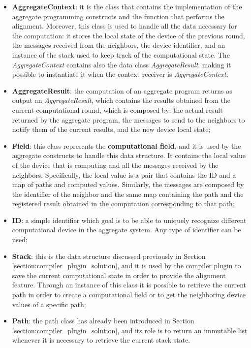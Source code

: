 \begin{itemize}
    \item \textbf{AggregateContext}: it is the class that contains the implementation of the aggregate programming constructs and the function that performs the alignment. Moreover, this class is used to handle all the data necessary for the computation: it stores the local state of the device of the previous round, the messages received from the neighbors, the device identifier, and an instance of the stack used to keep track of the computational state. The \textit{AggregateContext} contains also the data class \textit{AggregateResult}, making it possible to instantiate it when the context receiver is \textit{AggregateContext};
    \item \textbf{AggregateResult}: the computation of an aggregate program returns as output an \textit{AggregateResult}, which contains the results obtained from the current computational round, which is composed by: the actual result returned by the aggregate program, the messages to send to the neighbors to notify them of the current results, and the new device local state;
    \item \textbf{Field}: this class represents the \textbf{computational field}, and it is used by the aggregate constructs to handle this data structure. It contains the local value of the device that is computing and all the messages received by the neighbors. Specifically, the local value is a pair that contains the ID and a map of paths and computed values. Similarly, the messages are composed by the identifier of the neighbor and the same map containing the path and the registered result obtained in the computation corresponding to that path;
    \item \textbf{ID}: a simple identifier which goal is to be able to uniquely recognize different computational device in the aggregate system. Any type of identifier can be used;
    \item \textbf{Stack}: this is the data structure discussed previously in Section \ref{section:compiler_plugin_solution}, and it is used by the compiler plugin to save the current computational state in order to provide the alignment feature. Through an instance of this class it is possible to retrieve the current path in order to create a computational field or to get the neighboring device values of a specific path;
    \item \textbf{Path}: the path class has already been introduced in Section \ref{section:compiler_plugin_solution}, and its role is to return an immutable list whenever it is necessary to retrieve the current stack state.
\end{itemize}


